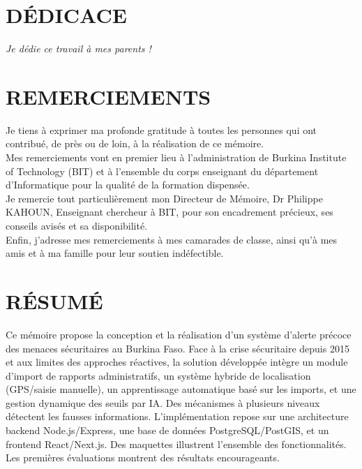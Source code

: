 \documentclass[12pt,a4paper]{article}
\begin{document}
\section*{DÉDICACE}
\vspace{1cm}
\begin{center}
    \textit{Je dédie ce travail à mes parents !}
\end{center}

\newpage
{}
{}
\section*{REMERCIEMENTS}
\vspace{1cm}
Je tiens à exprimer ma profonde gratitude à toutes les personnes qui ont contribué, de près ou de loin, à la réalisation de ce mémoire.\\
Mes remerciements vont en premier lieu à l'administration de Burkina Institute of Technology (BIT) et à l'ensemble du corps enseignant du département d'Informatique pour la qualité de la formation dispensée.\\
Je remercie tout particulièrement mon Directeur de Mémoire, Dr Philippe KAHOUN, Enseignant chercheur à BIT, pour son encadrement précieux, ses conseils avisés et sa disponibilité.\\
Enfin, j'adresse mes remerciements à mes camarades de classe, ainsi qu'à mes amis et à ma famille pour leur soutien indéfectible.

\newpage
{}
{}
\section*{RÉSUMÉ}
\vspace{1cm}
Ce mémoire propose la conception et la réalisation d'un système d'alerte précoce des menaces sécuritaires au Burkina Faso. Face à la crise sécuritaire depuis 2015 et aux limites des approches réactives, la solution développée intègre un module d'import de rapports administratifs, un système hybride de localisation (GPS/saisie manuelle), un apprentissage automatique basé sur les imports, et une gestion dynamique des seuils par IA. Des mécanismes à plusieurs niveaux détectent les fausses informations. L'implémentation repose sur une architecture backend Node.js/Express, une base de données PostgreSQL/PostGIS, et un frontend React/Next.js. Des maquettes illustrent l'ensemble des fonctionnalités. Les premières évaluations montrent des résultats encourageants.
\end{document}
